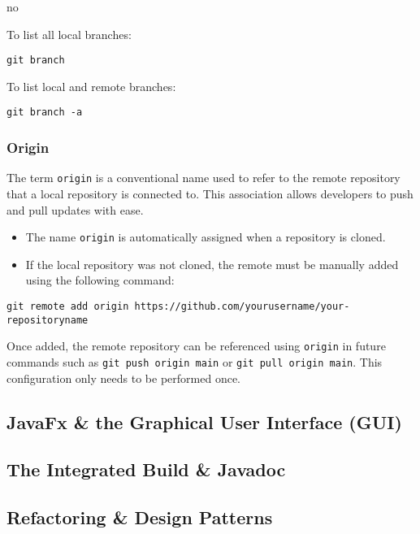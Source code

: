 no\documentclass{article}
\begin{document}
To list all local branches:

\begin{verbatim}
git branch
\end{verbatim}

\noindent To list local and remote branches:

\begin{verbatim}
git branch -a
\end{verbatim}

\subsubsection{Origin}

The term \texttt{origin} is a conventional name used to refer to the remote repository that a local repository is connected to. This association allows developers to push and pull updates with ease.

\begin{itemize}
    \item The name \texttt{origin} is automatically assigned when a repository is cloned.
    \item If the local repository was not cloned, the remote must be manually added using the following command:
\end{itemize}

\begin{verbatim}
git remote add origin https://github.com/yourusername/your-repositoryname
\end{verbatim}

\noindent Once added, the remote repository can be referenced using \texttt{origin} in future commands such as \texttt{git push origin main} or \texttt{git pull origin main}. This configuration only needs to be performed once.




\subsection{JavaFx \& the Graphical User Interface (GUI)}

\subsection{The Integrated Build \& Javadoc}

\subsection{Refactoring \& Design Patterns}
\end{document}
